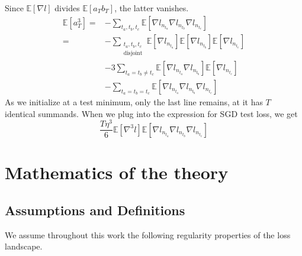 \documentclass[openany, notitlepage, justified]{tufte-book}
\theoremstyle{plain}
\theoremstyle{definition}
\newcommand{\expct}[1]{\mathbb{E}\left[#1\right]}
\begin{document}
\begin{shaded}
                Since $\expct{\nabla l}$ divides $\expct{a_T b_T}$, the latter
                vanishes.
                \begin{align*}
                    \expct{a_T^3}
                        =&- \sum_{t_a, t_b, t_c}
                                \expct{\nabla l_{n_{t_a}} \nabla l_{n_{t_b}} \nabla l_{n_{t_c}}}
                        \\
                        =&- \sum_{\substack{t_a, t_b, t_c\\ \text{disjoint}}}  
                                \expct{\nabla l_{n_{t_a}}} \expct{\nabla l_{n_{t_b}}} \expct{\nabla l_{n_{t_c}}}
                        \\&-3 \sum_{t_a=t_b\neq t_c}  
                                \expct{\nabla l_{n_{t_a}} \nabla l_{n_{t_b}}} \expct{\nabla l_{n_{t_c}}}
                        \\&-\sum_{t_a=t_b=t_c}  
                                \expct{\nabla l_{n_{t_a}} \nabla l_{n_{t_b}} \nabla l_{n_{t_c}}}
                \end{align*}
                As we initialize at a test minimum, only the last line remains, at
                it has $T$ identical summands.
                When we plug into the expression for SGD test loss, we get
                $$
                    \frac{T \eta^3 }{6}
                    \expct{\nabla^3 l}
                    \expct{\nabla l_{n_{t_a}} \nabla l_{n_{t_b}} \nabla l_{n_{t_c}}}
                $$
            \end{shaded}




\chapter{Mathematics of the theory}\label{appendix:math}
    \section{Assumptions and Definitions}                        \label{appendix:assumptions}
        We assume throughout this work the following regularity properties of
        the loss landscape.
        
\end{document}

